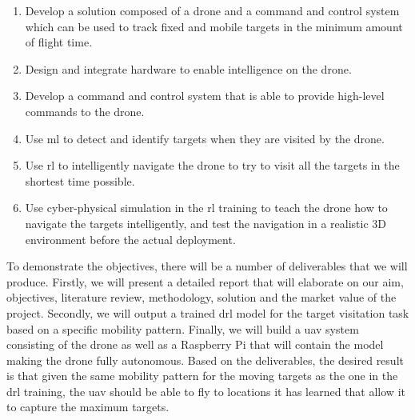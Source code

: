 \documentclass[../main.tex]{subfiles}
\begin{document}
\begin{enumerate}
    \item \label{obj:overview}
        Develop a solution composed of a drone and
        a command and control system which can be used
        to track fixed and mobile targets in the
        minimum amount of flight time.
    \item \label{obj:hardware} Design and integrate 
        hardware to enable 
        intelligence on the drone.
    \item Develop a command and control system that
        is able to provide high-level commands 
        to the drone.
    \item \label{obj:machine-learning} 
        Use \gls{ml} to detect and identify
        targets when they are visited by the drone.
    \item \label{obj:drl} Use \gls{rl}
        to intelligently
        navigate the drone to try to visit all the targets
        in the shortest time possible.
    \item \label{obj:simulation} 
        Use cyber-physical simulation in the \gls{rl} training
        to teach the drone how to navigate the targets
        intelligently, and test the navigation in a realistic
        3D environment before the actual deployment.
\end{enumerate}

To demonstrate the objectives, there will be a number 
of deliverables that we will produce.
Firstly, we will present a detailed report 
that will elaborate on our aim, objectives, 
literature review, methodology,
solution and the market value of the project.
Secondly, we will output a trained \gls{drl} model for 
the target visitation task based on a specific
mobility pattern.
Finally, we will build a \gls{uav} system
consisting of the \anafi drone as well as a Raspberry Pi
that will contain the model making the
\anafi drone fully autonomous.
Based on the deliverables, the desired result is that
given the same mobility pattern for 
the moving targets as the one in the \gls{drl} training,
the \gls{uav} should be able to fly to locations it has learned
that allow it to capture the maximum targets. 
\end{document}
